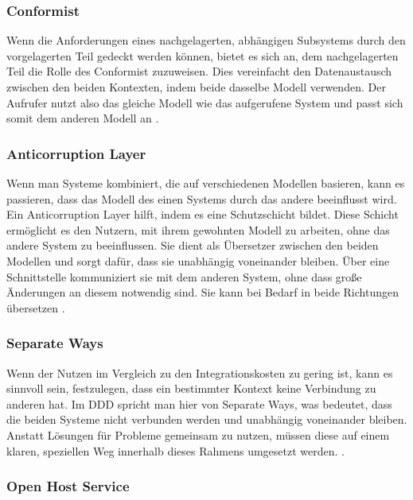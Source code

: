{\subsubsection{Conformist}

Wenn die Anforderungen eines nachgelagerten, abhängigen Subsystems durch den vorgelagerten Teil gedeckt werden können, bietet es sich an, dem nachgelagerten Teil die Rolle des \glqq Conformist\grqq{} zuzuweisen. Dies vereinfacht den Datenaustausch zwischen den beiden Kontexten, indem beide dasselbe Modell verwenden. Der Aufrufer nutzt also das gleiche Modell wie das aufgerufene System und passt sich somit dem anderen Modell an \cite[S. 361 - 363]{evans} \cite[S. 47]{wolff} \cite[S.66]{dowalil}.

\subsubsection{Anticorruption Layer}

Wenn man Systeme kombiniert, die auf verschiedenen Modellen basieren, kann es passieren, dass das Modell des einen Systems durch das andere beeinflusst wird. Ein \glqq Anticorruption Layer\grqq{} hilft, indem es eine Schutzschicht bildet. Diese Schicht ermöglicht es den Nutzern, mit ihrem gewohnten Modell zu arbeiten, ohne das andere System zu beeinflussen. Sie dient als Übersetzer zwischen den beiden Modellen und sorgt dafür, dass sie unabhängig voneinander bleiben. Über eine Schnittstelle kommuniziert sie mit dem anderen System, ohne dass große Änderungen an diesem notwendig sind. Sie kann bei Bedarf in beide Richtungen übersetzen \cite[S. 364 - 370]{evans} \cite[S. 47]{wolff} \cite[S.66]{dowalil}.

\subsubsection{Separate Ways}

Wenn der Nutzen im Vergleich zu den Integrationskosten zu gering ist, kann es sinnvoll sein, festzulegen, dass ein bestimmter Kontext keine Verbindung zu anderen hat. Im DDD spricht man hier von \glqq Separate Ways\grqq{}, was bedeutet, dass die beiden Systeme nicht verbunden werden und unabhängig voneinander bleiben. Anstatt Lösungen für Probleme gemeinsam zu nutzen, müssen diese auf einem klaren, speziellen Weg innerhalb dieses Rahmens umgesetzt werden. \cite[S. 371 - 373]{evans} \cite[S. 47]{wolff} \cite[S.66]{dowalil}.


\subsubsection{Open Host Service}

}
